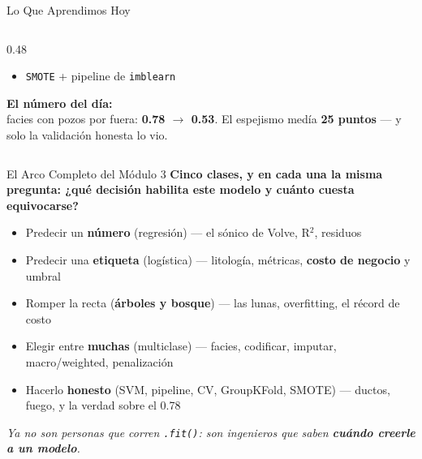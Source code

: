 \documentclass[aspectratio=169, 11pt]{beamer}
\begin{document}
\begin{frame}[shrink=10]{Lo Que Aprendimos Hoy}
\begin{columns}[T]
\begin{column}{0.48\textwidth}
{\begin{itemize}
          \texttt{GridSearchCV} con \texttt{svc\_\_C}
        \item[{\color{arcaRed}\scriptsize\faTools}]
          \texttt{SMOTE} + pipeline de \texttt{imblearn}
      \end{itemize}
      }
      \vspace{8pt}
      \begin{tcolorbox}[colback=arcaGray, colframe=arcaRed, boxrule=0pt, leftrule=3pt,
        arc=3pt, left=6pt, right=6pt, top=5pt, bottom=5pt]
        {\scriptsize\color{arcaDark}\bfseries El número del día:}\\[3pt]
        {\scriptsize\color{textMuted}
          facies con pozos por fuera: \textbf{0.78 \(\to\) 0.53}.
          El espejismo medía \textbf{25 puntos} --- y solo la
          validación honesta lo vio.}
      \end{tcolorbox}
    \end{column}
  \end{columns}
\end{frame}

\begin{frame}[shrink=8]{El Arco Completo del Módulo 3}
  \vspace{-4pt}
  {\small\color{arcaDark}\bfseries
    Cinco clases, y en cada una la misma pregunta: ¿qué decisión habilita este modelo y cuánto cuesta equivocarse?}

  \vspace{10pt}
  {\footnotesize\color{textMuted}
  \begin{itemize}\setlength{\itemsep}{6pt}
    \item[{\color{arcaRed}\bfseries C1}]
      Predecir un \textbf{número} (regresión) --- el sónico de Volve, R\(^2\), residuos
    \item[{\color{arcaRed}\bfseries C2}]
      Predecir una \textbf{etiqueta} (logística) --- litología, métricas,
      \textbf{costo de negocio} y umbral
    \item[{\color{arcaRed}\bfseries C3}]
      Romper la recta (\textbf{árboles y bosque}) --- las lunas, overfitting,
      el récord de costo
    \item[{\color{arcaRed}\bfseries C4}]
      Elegir entre \textbf{muchas} (multiclase) --- facies, codificar, imputar,
      macro/weighted, penalización
    \item[{\color{arcaRed}\bfseries C5}]
      Hacerlo \textbf{honesto} (SVM, pipeline, CV, GroupKFold, SMOTE) ---
      ductos, fuego, y la verdad sobre el 0.78
  \end{itemize}
  }

  \vspace{8pt}
  \centering
  {\footnotesize\color{arcaDark}\itshape
    Ya no son personas que corren \texttt{.fit()}: son ingenieros que saben
    \textbf{cuándo creerle a un modelo}.}
\end{frame}
\end{document}

